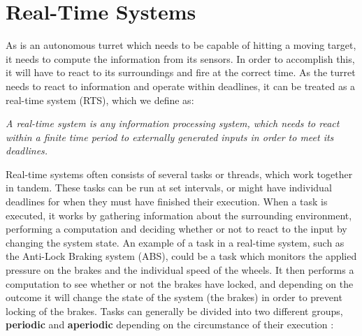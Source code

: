 \section{Real-Time Systems}\label{rts}


As \name is an autonomous turret which needs to be capable of hitting a moving
target, it needs to compute the information from its sensors. In order to
accomplish this, it will have to react to its surroundings and fire at the
correct time. As the turret needs to react to
information and operate within deadlines, it can be treated as a real-time
system (RTS), which we define as:

\begin{center}
\begin{minipage}{0.8\linewidth}
\textit{A real-time system is any information processing system, which needs to
react within a finite time period to externally generated inputs in order to
meet its deadlines.}
\end{minipage}
\end{center} 

Real-time systems often consists of several tasks or threads, which work
together in tandem. These tasks can be run at set intervals, or might have
individual deadlines for when they must have finished their execution. When a
task is executed, it works by gathering information about the surrounding
environment, performing a computation and deciding whether or not to react to
the input by changing the system state. An example of a task in a real-time
system, such as the Anti-Lock Braking system (ABS), could be a task which
monitors the applied pressure on the brakes and the individual speed of the wheels. It
then performs a computation to see whether or not the brakes have locked, and
depending on the outcome it will change the state of the system (the brakes) in
order to prevent locking of the brakes. Tasks can generally be divided into two
different groups, \textbf{periodic} and \textbf{aperiodic} depending on the
circumstance of their execution \citep[ch.1A]{Realtime}:

